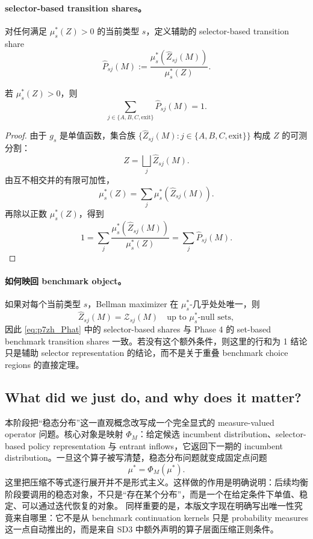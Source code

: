 \paragraph{selector-based transition shares。}
对任何满足 $\mu_s^*(Z)>0$ 的当前类型 $s$，定义辅助的 selector-based transition share
\begin{equation}
\widehat P_{sj}(M):=\frac{\mu_s^*(\widehat Z_{sj}(M))}{\mu_s^*(Z)}.
\label{eq:p7zh_Phat}
\end{equation}

\begin{lemma}
若 $\mu_s^*(Z)>0$，则
\[
\sum_{j\in\{A,B,C,\mathrm{exit}\}}\widehat P_{sj}(M)=1.
\]
\end{lemma}

\begin{proof}
由于 $g_s$ 是单值函数，集合族 $\{\widehat Z_{sj}(M):j\in\{A,B,C,\mathrm{exit}\}\}$ 构成 $Z$ 的可测分割：
\[
Z=\bigsqcup_j \widehat Z_{sj}(M).
\]
由互不相交并的有限可加性，
\[
\mu_s^*(Z)=\sum_j\mu_s^*(\widehat Z_{sj}(M)).
\]
再除以正数 $\mu_s^*(Z)$，得到
\[
1=\sum_j\frac{\mu_s^*(\widehat Z_{sj}(M))}{\mu_s^*(Z)}
=\sum_j \widehat P_{sj}(M).
\]
\end{proof}

\paragraph{如何映回 benchmark object。}
如果对每个当前类型 $s$，Bellman maximizer 在 $\mu_s^*$-几乎处处唯一，则
\[
\widehat Z_{sj}(M)=\mathcal Z_{sj}(M)
\quad\text{up to }\mu_s^*\text{-null sets},
\]
因此 \eqref{eq:p7zh_Phat} 中的 selector-based shares 与 Phase 4 的 set-based benchmark transition shares 一致。若没有这个额外条件，则这里的行和为 1 结论只是辅助 selector representation 的结论，而不是关于重叠 benchmark choice regions 的直接定理。

\subsection{What did we just do, and why does it matter?}

本阶段把“稳态分布”这一直观概念改写成一个完全显式的 measure-valued operator 问题。核心对象是映射 $\Phi_M$：给定候选 incumbent distribution、selector-based policy representation 与 entrant inflows，它返回下一期的 incumbent distribution。一旦这个算子被写清楚，稳态分布问题就变成固定点问题
\[
\mu^*=\Phi_M(\mu^*).
\]
这里把压缩不等式逐行展开并不是形式主义。这样做的作用是明确说明：后续均衡阶段要调用的稳态对象，不只是“存在某个分布”，而是一个在给定条件下单值、稳定、可以通过迭代恢复的对象。
同样重要的是，本版文字现在明确写出唯一性究竟来自哪里：它不是从 benchmark continuation kernels 只是 probability measures 这一点自动推出的，而是来自 SD3 中额外声明的算子层面压缩正则条件。

